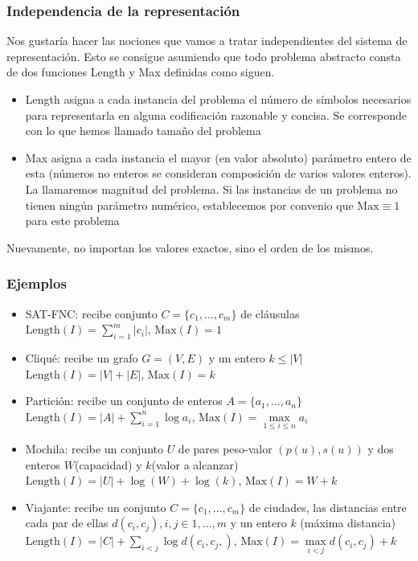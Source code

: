 \documentclass{beamer}
\begin{document}
\begin{frame}
	\frametitle{Independencia de la representación}
	Nos gustaría hacer las nociones que vamos a tratar independientes del sistema de representación. Esto se consigue asumiendo que todo problema abstracto consta de dos funciones Length y Max definidas como siguen.
	\begin{itemize}
		\item \alert{Length} asigna a cada instancia del problema el número de símbolos necesarios para representarla en alguna codificación razonable y concisa. Se corresponde con lo que hemos llamado tamaño del problema
		\item \alert{Max} asigna a cada instancia el mayor (en valor absoluto) parámetro entero de esta (números no enteros se consideran composición de varios valores enteros). La llamaremos magnitud del problema. Si las instancias de un problema no tienen ningún parámetro numérico, establecemos por convenio que $\text{Max}\equiv1$ para este problema
	\end{itemize}
    
    Nuevamente, no importan los valores exactos, sino el orden de los mismos.
\end{frame}

\begin{frame}
	\frametitle{Ejemplos}
	\begin{itemize}
		\item SAT-FNC: recibe conjunto $C=\{c_1,...,c_m\}$ de cláusulas\\
		$\text{Length}(I)= \sum_{i=1}^m |c_i|$, $\text{Max}(I)= 1$
		\item Cliqué: recibe un grafo  $G=(V,E)$ y un entero $k\leq |V|$
		$\text{Length}(I)= |V| + |E|$, $\text{Max}(I)= k$
		\item Partición: recibe un conjunto de enteros $A= \{a_1,...,a_n\}$\\
		$\text{Length}(I)= |A|+ \sum_{i=1}^n\log a_i $, $\text{Max}(I)= \max\limits_{1\leq i\leq n} a_i$
		\item Mochila: recibe un conjunto $U$ de pares peso-valor $(p(u),s(u))$ y dos enteros $W$(capacidad) y $k$(valor a alcanzar)\\
		$\text{Length}(I)= |U| + \log(W) + \log(k) $, $\text{Max}(I)= W + k$
		\item Viajante: recibe un conjunto $C=\{c_1,...,c_m\}$ de ciudades, las distancias entre cada par de ellas $d(c_i,c_j), i,j\in{1,...,m}$ y un entero $k$ (máxima distancia)\\
		$\text{Length}(I)= |C|+ \sum_{i<j}\log d(c_i,c_j,) $, $\text{Max}(I)= \max\limits_{i<j}d(c_i,c_j) + k $
	\end{itemize}
\end{frame}
\end{document}
